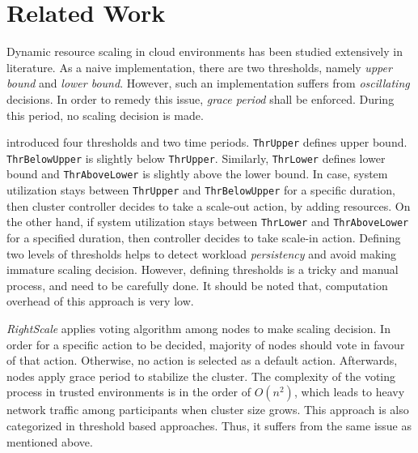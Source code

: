 \chapter{Related Work}
Dynamic resource scaling in cloud environments has been studied extensively in literature. As a naive implementation, there are two thresholds, namely \emph{upper bound} and \emph{lower bound}. However, such an implementation suffers from \emph{oscillating} decisions. In order to remedy this issue, \emph{grace period} shall be enforced. During this period, no scaling decision is made. \newline

\textcite{Hasan2012IntegratedAA} introduced four thresholds and two time periods. \lstinline$ThrUpper$ defines upper bound. \lstinline$ThrBelowUpper$ is slightly below \lstinline$ThrUpper$. Similarly, \lstinline$ThrLower$ defines lower bound and \lstinline$ThrAboveLower$ is slightly above the lower bound. In case, system utilization stays between \lstinline$ThrUpper$ and \lstinline$ThrBelowUpper$ for a specific duration, then cluster controller decides to take a scale-out action, by adding resources. On the other hand, if system utilization stays between \lstinline$ThrLower$ and \lstinline$ThrAboveLower$ for a specified duration, then controller decides to take scale-in action. Defining two levels of thresholds helps to detect workload \emph{persistency} and avoid making immature scaling decision. However, defining thresholds is a tricky and manual process, and need to be carefully done\cite{Dutreilh2010From}. It should be noted that, computation overhead of this approach is very low. \newline

\emph{RightScale} applies voting algorithm\cite{RightScale} among nodes to make scaling decision. In order for a specific action to be decided, majority of nodes should vote in favour of that action. Otherwise, no action is selected as a default action. Afterwards, nodes apply grace period to stabilize the cluster. The complexity of the voting process in trusted environments is in the order of $O(n^2)$, which leads to heavy network traffic among participants when cluster size grows. This approach is also categorized in threshold based approaches. Thus, it suffers from the same issue as mentioned above.\newline

